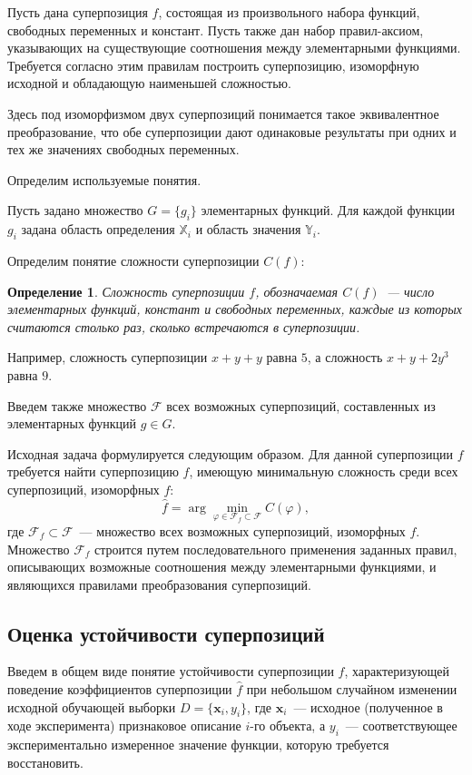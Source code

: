 \documentclass[12pt,a4paper]{article}
\newtheorem{defin}{Определение}
\begin{document}
Пусть дана суперпозиция $f$, состоящая из произвольного набора
функций, свободных переменных и констант. Пусть также дан набор
правил-аксиом, указывающих на существующие соотношения между элементарными
функциями. Требуется согласно этим правилам построить суперпозицию, изоморфную
исходной и обладающую наименьшей сложностью.

Здесь под изоморфизмом двух суперпозиций понимается такое эквивалентное
преобразование, что обе суперпозиции дают одинаковые результаты при одних и тех
же значениях свободных переменных.

Определим используемые понятия.

Пусть задано множество $G = \{ g_i \}$ элементарных функций. Для каждой функции
$g_i$ задана область определения $\mathbb{X}_i$ и область значения
$\mathbb{Y}_i$. 

Определим понятие сложности суперпозиции $C(f)$:
\begin{defin}
  \label{def:complexity}
  Сложность суперпозиции $f$, обозначаемая $C(f)$~--- число элементарных функций, констант и
  свободных переменных, каждые из которых считаются столько раз, сколько
  встречаются в суперпозиции.
\end{defin}
Например, сложность суперпозиции $x+y+y$ равна $5$, а сложность $x + y + 2y^3$ равна $9$.

Введем также множество $\mathcal{F}$ всех возможных суперпозиций, составленных из
элементарных функций $g \in G$.

Исходная задача формулируется следующим образом. Для данной
суперпозиции $f$ требуется найти суперпозицию $\hat{f}$, имеющую минимальную
сложность среди всех суперпозиций, изоморфных $f$:
\[
\hat{f} = \arg \min_{\varphi \in \mathcal{F}_f \subset \mathcal{F}} C (\varphi),
\]
где $\mathcal{F}_f \subset \mathcal{F}$~--- множество всех возможных
суперпозиций, изоморфных $f$. Множество $\mathcal{F}_f$ строится путем
последовательного применения заданных правил, описывающих возможные соотношения
между элементарными функциями, и являющихся правилами преобразования
суперпозиций.

\subsection{Оценка устойчивости суперпозиций}
Введем в общем виде понятие устойчивости суперпозиции $f$, характеризующей
поведение коэффициентов суперпозиции $\hat{f}$ при небольшом случайном
изменении исходной обучающей выборки
$D = \{ \mathbf{x}_i, y_i \}$,
где $\mathbf{x}_i$~--- исходное (полученное в ходе эксперимента)
признаковое описание $i$-го объекта, а $y_i$~--- соответствующее экспериментально
измеренное значение функции, которую требуется восстановить.
\end{document}
